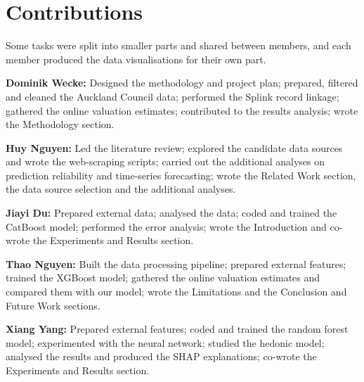 \documentclass[conference]{IEEEtran}
\begin{document}
\section*{Contributions}
Some tasks were split into smaller parts and shared between members, and
each member produced the data visualisations for their own part.

\noindent\textbf{Dominik Wecke:} Designed the methodology and project
plan; prepared, filtered and cleaned the Auckland Council data; performed
the Splink record linkage; gathered the online valuation estimates;
contributed to the results analysis; wrote the Methodology section.

\noindent\textbf{Huy Nguyen:} Led the literature review; explored the
candidate data sources and wrote the web-scraping scripts; carried out
the additional analyses on prediction reliability and time-series
forecasting; wrote the Related Work section, the data source selection
and the additional analyses.

\noindent\textbf{Jiayi Du:} Prepared external data; analysed the data;
coded and trained the CatBoost model; performed the error analysis;
wrote the Introduction and co-wrote the Experiments and Results
section.

\noindent\textbf{Thao Nguyen:} Built the data processing pipeline;
prepared external features; trained the XGBoost model; gathered the
online valuation estimates and compared them with our model; wrote the
Limitations and the Conclusion and Future Work sections.

\noindent\textbf{Xiang Yang:} Prepared external features; coded and
trained the random forest model; experimented with the neural network;
studied the hedonic model; analysed the results
and produced the SHAP explanations; co-wrote the Experiments and Results
section.



\end{document}
